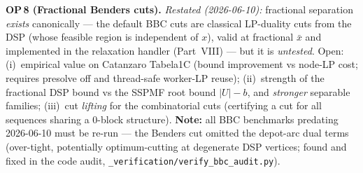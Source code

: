 \documentclass[11pt,a4paper]{article}
\begin{document}
\begin{op}
\textbf{OP\,8 (Fractional Benders cuts).}
\emph{Restated (2026-06-10):} fractional separation \emph{exists} canonically
--- the default BBC cuts are classical LP-duality cuts from the DSP (whose
feasible region is independent of $x$), valid at fractional $\bar x$ and
implemented in the relaxation handler (Part~VIII) --- but it is \emph{untested}.
Open: (i)~empirical value on Catanzaro Tabela1C (bound improvement vs node-LP
cost; requires presolve off and thread-safe worker-LP reuse); (ii)~strength of
the fractional DSP bound vs the SSPMF root bound $|U|-b$, and \emph{stronger}
separable families; (iii)~cut \emph{lifting} for the combinatorial cuts
(certifying a cut for all sequences sharing a $0$-block structure).
\textbf{Note:} all BBC benchmarks predating 2026-06-10 must be re-run --- the
Benders cut omitted the depot-arc dual terms (over-tight, potentially
optimum-cutting at degenerate DSP vertices; found and fixed in the code audit,
\texttt{\_verification/verify\_bbc\_audit.py}).
\end{op}
\end{document}
